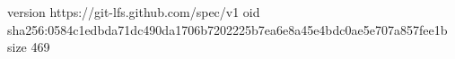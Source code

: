 version https://git-lfs.github.com/spec/v1
oid sha256:0584c1edbda71dc490da1706b7202225b7ea6e8a45e4bdc0ae5e707a857fee1b
size 469
